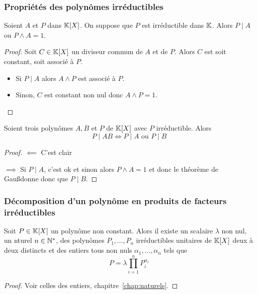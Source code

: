 \subsubsection{Propriétés des polynômes irréductibles}

\begin{prop}
  Soient $A$ et $P$ dans $\mathbb{K}[X]$. On suppose que $P$ est irréductible dans $\mathbb{K}$. Alors $P\mid{}A$ ou $P \wedge A=1$.
\end{prop}
\begin{proof}
  Soit $C \in \mathbb{K}[X]$ un diviseur commun de $A$ et de $P$. Alors $C$ est soit constant, soit associé à $P$.
  \begin{itemize}
  \item Si $P\mid{}A$ alors $A\wedge P$ est associé à $P$.
  \item Sinon, $C$ est constant non nul donc $A \wedge P=1$.
  \end{itemize}
\end{proof}

\begin{prop}
  Soient trois polynômes $A,B$ et $P$ de $\mathbb{K}[X]$ avec $P$ irréductible. Alors
  \begin{equation}
    P\mid{}AB \iff P\mid{}A \text{~ou~} P\mid{}B
  \end{equation}
\end{prop}
\begin{proof}
  $\impliedby$ C'est clair

  $\implies$ Si $P\mid{}A$, c'est ok et sinon alors $P \wedge A=1$ et donc le théorème de Gau\ss donne donc que $P\mid{}B$.
\end{proof}

\subsubsection{Décomposition d'un polynôme en produits de facteurs irréductibles}

\begin{theo}
  Soit $P \in \mathbb{K}[X]$ un polynôme non constant. Alors il existe un scalaire $\lambda$ non nul, un nturel $n \in \mathbb{N}^*$, des polynômes $P_1, \ldots, P_n$ irréductibles unitaires de $\mathbb{K}[X]$ deux à deux distincts et des entiers tous non nuls $\alpha_1, \ldots, \alpha_n$ tels que
  \begin{equation}
    P = \lambda \prod_{i=1}^n P_i^{\alpha_i}
  \end{equation}
\end{theo}
\begin{proof}
  Voir celles des entiers, chapitre~\ref{chap:naturels}.
\end{proof}

